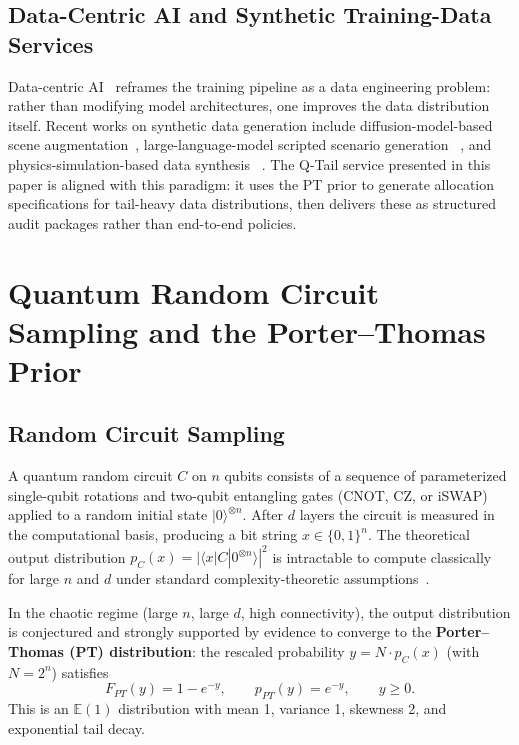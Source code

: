 \documentclass[10pt]{article}
\newcommand{\Exp}{\mathbb{E}}
\begin{document}
\subsection{Data-Centric AI and Synthetic Training-Data Services}
Data-centric AI~\citep{datacentricai} reframes the training pipeline as a data engineering
problem: rather than modifying model architectures, one improves the data distribution itself.
Recent works on synthetic data generation include diffusion-model-based scene
augmentation~\citep{pohlen2022diffuse}, large-language-model scripted scenario generation
~\citep{gong2023programmatic}, and physics-simulation-based data synthesis
~\citep{toyonobu2021Isaac}.  The Q-Tail service presented in this paper is aligned with
this paradigm: it uses the PT prior to generate allocation specifications for tail-heavy
data distributions, then delivers these as structured audit packages rather than
end-to-end policies.

\section{Quantum Random Circuit Sampling and the Porter--Thomas Prior}
\label{sec:pt_prior}

\subsection{Random Circuit Sampling}
A quantum random circuit $C$ on $n$ qubits consists of a sequence of parameterized
single-qubit rotations and two-qubit entangling gates (CNOT, CZ, or iSWAP) applied to
a random initial state $|0\rangle^{\otimes n}$.  After $d$ layers the circuit is measured
in the computational basis, producing a bit string $x\in\{0,1\}^n$.
The theoretical output distribution $p_C(x)=|\langle x|C|0^{\otimes n}\rangle|^2$ is
intractable to compute classically for large $n$ and $d$ under standard complexity-theoretic
assumptions~\citep{aaronson2011computational}.

In the chaotic regime (large $n$, large $d$, high connectivity), the output distribution
is conjectured and strongly supported by evidence to converge to the
\textbf{Porter--Thomas (PT) distribution}:
the rescaled probability $y=N\cdot p_C(x)$ (with $N=2^n$) satisfies
\begin{equation}
  F_{PT}(y) = 1 - e^{-y}, \qquad
  p_{PT}(y) = e^{-y}, \qquad y\ge 0.
  \label{eq:pt_law}
\end{equation}
This is an $\Exp(1)$ distribution with mean 1, variance 1, skewness 2, and
exponential tail decay.
\end{document}
